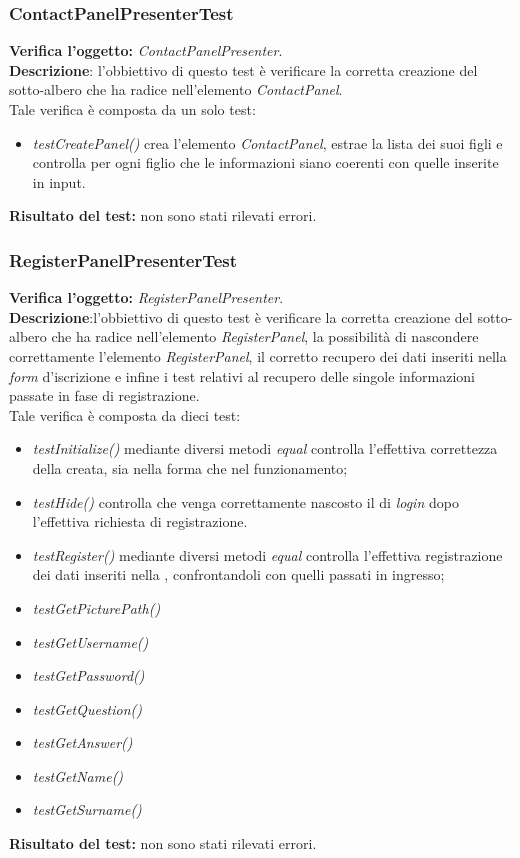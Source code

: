 \subsubsection{ContactPanelPresenterTest}
\textbf{Verifica l'oggetto:} \textit{ContactPanelPresenter}.\\
\textbf{Descrizione}: l'obbiettivo di questo test è verificare la corretta creazione del sotto-albero che ha radice nell'elemento \textit{ContactPanel}.\\
Tale verifica è composta da un solo test:
\begin{itemize}
\item \textit{testCreatePanel() }crea l'elemento \textit{ContactPanel}, estrae la lista dei suoi figli e controlla per ogni figlio che le informazioni siano coerenti con quelle inserite in input.
\end{itemize}
\textbf{Risultato del test:} non sono stati rilevati errori.


\subsubsection{RegisterPanelPresenterTest}
\textbf{Verifica l'oggetto:} \textit{RegisterPanelPresenter}.\\
\textbf{Descrizione}:l'obbiettivo di questo test è verificare la corretta creazione del sotto-albero che ha radice nell'elemento \textit{RegisterPanel}, la possibilità di nascondere correttamente l'elemento \textit{RegisterPanel}, il corretto recupero dei dati inseriti nella \textit{form} d'iscrizione e infine i test relativi al recupero delle singole informazioni passate in fase di registrazione.\\
Tale verifica è composta da dieci test:
\begin{itemize}
\item \textit{testInitialize() } mediante diversi metodi \textit{equal} controlla l'effettiva correttezza della  creata, sia nella forma che nel funzionamento;
\item \textit{testHide() } controlla che venga correttamente nascosto il  di \textit{login} dopo l'effettiva richiesta di registrazione.
\item \textit{testRegister() } mediante diversi metodi \textit{equal} controlla l'effettiva registrazione dei dati inseriti nella , confrontandoli con quelli passati in ingresso;
\item \textit{testGetPicturePath() } 
\item \textit{testGetUsername() }
\item \textit{testGetPassword() }
\item \textit{testGetQuestion() }
\item \textit{testGetAnswer() }
\item \textit{testGetName() }
\item \textit{testGetSurname() }

\end{itemize}
\textbf{Risultato del test:} non sono stati rilevati errori.



